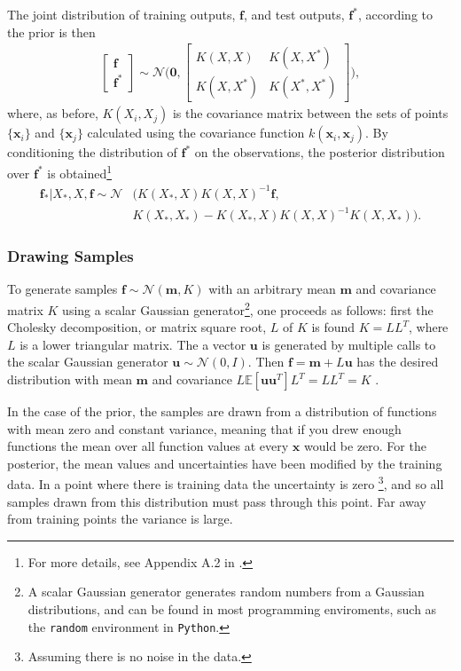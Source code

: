 \documentclass[twoside,english]{uiofysmaster}
\begin{document}
The joint distribution of training outputs, $\textbf{f}$, and test outputs, $\textbf{f}^*$, according to the prior is then
\begin{align}
\begin{bmatrix}
\textbf{f}\\
\textbf{f}^*
\end{bmatrix}
\sim 
\mathcal{N} \Bigg(
\boldsymbol{0},
\begin{bmatrix}
K(X, X) & K(X, X^*)\\
K(X, X^*) & K(X^*, X^*)
\end{bmatrix}
 \Bigg),
\end{align}
where, as before, $K(X_i, X_j)$ is the covariance matrix between the sets of points $\{ \textbf{x}_i \}$ and $\{\textbf{x}_j \}$ calculated using the covariance function $k(\textbf{x}_i, \textbf{x}_j)$. By conditioning the distribution of $\textbf{f}^*$ on the observations,  the posterior distribution over $\textbf{f}^*$ is obtained\footnote{For more details, see Appendix A.2 in \cite{rasmussen2006gaussian}.}  \cite{rasmussen2006gaussian} 
\begin{align}
\textbf{f}_* \big| X_*, X, \textbf{f} \sim \mathcal{N}&(K(X_*, X)K(X, X)^{-1} \textbf{f},\\ &K(X_*, X_*) - K(X_*, X)K(X, X)^{-1}K(X, X_*)).
\end{align}


\subsubsection{Drawing Samples}

To generate samples $\textbf{f} \sim \mathcal{N}(\textbf{m}, K)$ with an arbitrary mean $\textbf{m}$ and covariance matrix $K$ using a scalar Gaussian generator\footnote{A scalar Gaussian generator generates random numbers from a Gaussian distributions, and can be found in most programming enviroments, such as the \verb|random| environment in \verb|Python|.}, one proceeds as follows: first the Cholesky decomposition, or matrix square root, $L$ of $K$ is found $K = LL^T$, where $L$ is a lower triangular matrix. The a vector $\textbf{u}$ is generated by multiple calls to the scalar Gaussian generator $\textbf{u} \sim \mathcal{N}(0, I)$. Then $\textbf{f} = \textbf{m} + L \textbf{u}$ has the desired distribution with mean $\textbf{m}$ and covariance $L \mathbb{E} [\textbf{u} \textbf{u}^T]L^T = LL^T = K$ \cite{rasmussen2006gaussian}.

 In the case of the prior, the samples are drawn from a distribution of functions with mean zero and constant variance, meaning that if you drew enough functions the mean over all function values at every $\textbf{x}$ would be zero. For the posterior, the mean values and uncertainties have been modified by the training data. In a point where there is training data the uncertainty is zero \footnote{Assuming there is no noise in the data.}, and so all samples drawn from this distribution must pass through this point. Far away from training points the variance is large.
\end{document}
